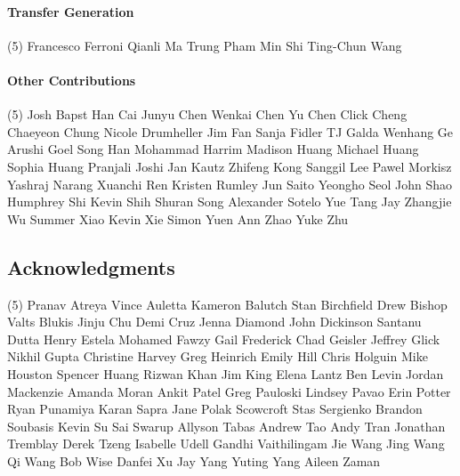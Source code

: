 \vspace{-0.32\baselineskip}\paragraph{\footnotesize Transfer Generation} \mbox{}
\vspace{-0.32\baselineskip}
\begingroup
\footnotesize
\begin{tasks}[label=\relax, label-width=0pt, item-indent=4pt](5)
\task Francesco Ferroni
\task Qianli Ma
\task Trung Pham
\task Min Shi
\task Ting-Chun Wang
\end{tasks}
\endgroup

\paragraph{Other Contributions} \mbox{}
\vspace{-0.32\baselineskip}
\begingroup
\footnotesize
\begin{tasks}[label=\relax, label-width=0pt, item-indent=4pt](5)
\task Josh Bapst 
\task Han Cai 
\task Junyu Chen 
\task Wenkai Chen
\task Yu Chen
\task Click Cheng 
\task Chaeyeon Chung 
\task Nicole Drumheller 
\task Jim Fan 
\task Sanja Fidler 
\task TJ Galda 
\task Wenhang Ge 
\task Arushi Goel 
\task Song Han 
\task Mohammad Harrim 
\task Madison Huang 
\task Michael Huang 
\task Sophia Huang 
\task Pranjali Joshi 
\task Jan Kautz 
\task Zhifeng Kong 
\task Sanggil Lee 
\task Pawel Morkisz 
\task Yashraj Narang 
\task Xuanchi Ren 
\task Kristen Rumley 
\task Jun Saito 
\task Yeongho Seol 
\task John Shao
\task Humphrey Shi 
\task Kevin Shih 
\task Shuran Song 
\task Alexander Sotelo 
\task Yue Tang 
\task Jay Zhangjie Wu 
\task Summer Xiao
\task Kevin Xie 
\task Simon Yuen 
\task Ann Zhao
\task Yuke Zhu 
\end{tasks}
\endgroup

\subsection{Acknowledgments}
\begingroup
\footnotesize
\begin{tasks}[label=\relax, label-width=0pt, item-indent=4pt](5)
\task Pranav Atreya
\task Vince Auletta
\task Kameron Balutch
\task Stan Birchfield
\task Drew Bishop
\task Valts Blukis
\task Jinju Chu
\task Demi Cruz
\task Jenna Diamond
\task John Dickinson
\task Santanu Dutta
\task Henry Estela
\task Mohamed Fawzy
\task Gail Frederick
\task Chad Geisler
\task Jeffrey Glick
\task Nikhil Gupta
\task Christine Harvey
\task Greg Heinrich
\task Emily Hill
\task Chris Holguin
\task Mike Houston
\task Spencer Huang
\task Rizwan Khan
\task Jim King
\task Elena Lantz
\task Ben Levin
\task Jordan Mackenzie
\task Amanda Moran
\task Ankit Patel
\task Greg Pauloski
\task Lindsey Pavao
\task Erin Potter
\task Ryan Punamiya 
\task Karan Sapra 
\task Jane Polak Scowcroft
\task Stas Sergienko
\task Brandon Soubasis
\task Kevin Su
\task Sai Swarup
\task Allyson Tabas
\task Andrew Tao 
\task Andy Tran
\task Jonathan Tremblay
\task Derek Tzeng
\task Isabelle Udell
\task Gandhi Vaithilingam
\task Jie Wang
\task Jing Wang
\task Qi Wang
\task Bob Wise
\task Danfei Xu 
\task Jay Yang
\task Yuting Yang
\task Aileen Zaman
\end{tasks}
\endgroup
